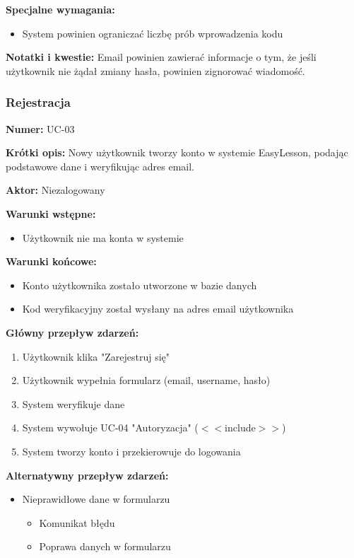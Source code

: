 \documentclass[12pt,a4paper]{article}
\begin{document}
\textbf{Specjalne wymagania:}
\begin{itemize}[leftmargin=*]
    \item System powinien ograniczać liczbę prób wprowadzenia kodu
\end{itemize}

\textbf{Notatki i kwestie:} Email powinien zawierać informacje o tym, że jeśli użytkownik nie żądał zmiany hasła, powinien zignorować wiadomość.

\subsubsection{Rejestracja}

\textbf{Numer:} UC-03

\textbf{Krótki opis:} Nowy użytkownik tworzy konto w systemie EasyLesson, podając podstawowe dane i weryfikując adres email.

\textbf{Aktor:} Niezalogowany

\textbf{Warunki wstępne:}
\begin{itemize}[leftmargin=*]
    \item Użytkownik nie ma konta w systemie
\end{itemize}

\textbf{Warunki końcowe:}
\begin{itemize}[leftmargin=*]
    \item Konto użytkownika zostało utworzone w bazie danych
    \item Kod weryfikacyjny został wysłany na adres email użytkownika
\end{itemize}

\textbf{Główny przepływ zdarzeń:}
\begin{enumerate}[leftmargin=*]
    \item Użytkownik klika "Zarejestruj się"
    \item Użytkownik wypełnia formularz (email, username, hasło)
    \item System weryfikuje dane
    \item System wywołuje UC-04 "Autoryzacja" ($<<$include$>>$)
    \item System tworzy konto i przekierowuje do logowania
\end{enumerate}

\textbf{Alternatywny przepływ zdarzeń:}
\begin{itemize}[leftmargin=*]
    \item[2a] Nieprawidłowe dane w formularzu
    \begin{itemize}[leftmargin=*]
    \item Komunikat błędu
    \item Poprawa danych w formularzu
\end{itemize}
\end{itemize}
\end{document}
